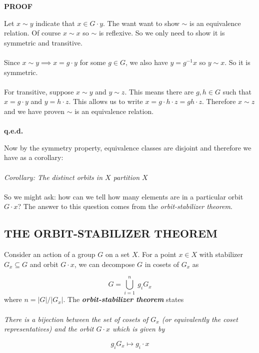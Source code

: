 \documentclass[9 pt]{report}
\begin{document}
\begin{center}
	\textbf{PROOF}
\end{center}
Let $x\sim y$ indicate that $x\in G\cdot y$. The want want to show $\sim$ is an equivalence relation. Of course $x\sim x$ so $\sim$ is reflexive. So we only need to show it is symmetric and transitive. 
\\
\\
Since $x\sim y \implies x = g\cdot y$ for some $g\in G$, we also have $y=g^{-1}x$ so $y\sim x$. So it is symmetric. 
\\
\\
For transitive, suppose $x\sim y$ and $y\sim z$. This means there are $g,h\in G$ such that $x = g\cdot y$ and $y= h\cdot z$. This allows us to write $ x = g\cdot h\cdot z = gh\cdot z$. Therefore $x\sim z$ and we have proven $\sim $ is an equivalence relation.
\\
\\
\textbf{q.e.d.}


\newpage

Now by the symmetry property, equivalence classes are disjoint and therefore we have as a corollary:
\\
\\
\emph{Corollary: The distinct orbits in $X$ partition $X$}
\\
\\
So we might ask: how can we tell how many elements are in a particular orbit $G\cdot x$? The answer to this question comes from the \emph{orbit-stabilizer theorem}.

{\centering
\subsection*{THE ORBIT-STABILIZER THEOREM}}

\begin{tcolorbox}
	Consider an action of a group $G$ on a set $X$. For a point $x\in X$ with stabilizer $G_x \subseteq G $ and orbit $G\cdot x$, we can decompose $G$ in cosets of $G_x$ as
	
	$$ G = \bigcup_{i=1}^n \: g_i G_x $$
	where $n=|G|/|G_x|$. The \textbf{\emph{orbit-stabilizer theorem}} states
	\\
	\\
	\emph{There is a bijection between the set of cosets of $G_x$ (or equivalently the coset representatives) and the orbit $G\cdot x$ which is given by}
	
	$$ g_iG_x\mapsto g_i\cdot x $$
\end{tcolorbox}
\end{document}
